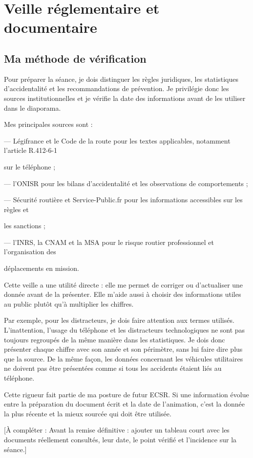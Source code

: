 \chapter{Veille réglementaire et documentaire}
\section{Ma méthode de vérification}

Pour préparer la séance, je dois distinguer les règles juridiques, les statistiques d’accidentalité et les recommandations de prévention. Je privilégie donc les sources institutionnelles et je vérifie la date des informations avant de les utiliser dans le diaporama.

Mes principales sources sont :

— Légifrance et le Code de la route pour les textes applicables, notamment l’article R.412-6-1

sur le téléphone ;

— l’ONISR pour les bilans d’accidentalité et les observations de comportements ;

— Sécurité routière et Service-Public.fr pour les informations accessibles sur les règles et

les sanctions ;

— l’INRS, la CNAM et la MSA pour le risque routier professionnel et l’organisation des

déplacements en mission.

Cette veille a une utilité directe : elle me permet de corriger ou d’actualiser une donnée avant de la présenter. Elle m’aide aussi à choisir des informations utiles au public plutôt qu’à multiplier les chiffres.

Par exemple, pour les distracteurs, je dois faire attention aux termes utilisés. L’inattention, l’usage du téléphone et les distracteurs technologiques ne sont pas toujours regroupés de la même manière dans les statistiques. Je dois donc présenter chaque chiffre avec son année et son périmètre, sans lui faire dire plus que la source. De la même façon, les données concernant les véhicules utilitaires ne doivent pas être présentées comme si tous les accidents étaient liés au téléphone.

Cette rigueur fait partie de ma posture de futur ECSR. Si une information évolue entre la préparation du document écrit et la date de l’animation, c’est la donnée la plus récente et la mieux sourcée qui doit être utilisée.

[À compléter : Avant la remise définitive : ajouter un tableau court avec les documents réellement consultés, leur date, le point vérifié et l’incidence sur la séance.]
